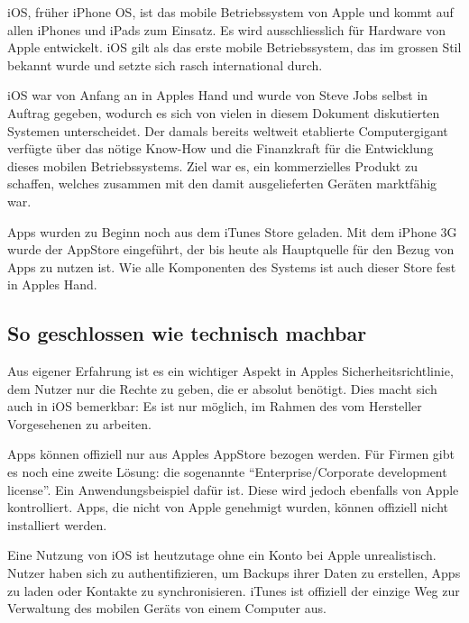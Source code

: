 iOS, früher iPhone OS, ist das mobile Betriebssystem von Apple und kommt auf allen iPhones und iPads zum Einsatz. Es wird ausschliesslich für Hardware von Apple entwickelt\thinspace\cite{online:ios-wikipedia}. iOS gilt als das erste mobile Betriebssystem, das im grossen Stil bekannt wurde und setzte sich rasch international durch.

iOS war von Anfang an in Apples Hand und wurde von Steve Jobs selbst in Auftrag gegeben, wodurch es sich von vielen in diesem Dokument diskutierten Systemen unterscheidet\thinspace\cite{online:ios-wikipedia}. Der damals bereits weltweit etablierte Computergigant verfügte über das nötige \mbox{Know-How} und die Finanzkraft für die Entwicklung dieses mobilen Betriebssystems. Ziel war es, ein kommerzielles Produkt zu schaffen, welches zusammen mit den damit ausgelieferten Geräten marktfähig war.

Apps wurden zu Beginn noch aus dem iTunes Store geladen\thinspace\cite{online:ios-appstore}. Mit dem iPhone 3G wurde der AppStore eingeführt, der bis heute als Hauptquelle für den Bezug von Apps zu nutzen ist. Wie alle Komponenten des Systems ist auch dieser Store fest in Apples Hand.
\newline

\subsection{So geschlossen wie technisch machbar}
Aus eigener Erfahrung ist es ein wichtiger Aspekt in Apples Sicherheitsrichtlinie, dem Nutzer nur die Rechte zu geben, die er absolut benötigt. Dies macht sich auch in iOS bemerkbar: Es ist nur möglich, im Rahmen des vom Hersteller Vorgesehenen zu arbeiten.

Apps können offiziell nur aus Apples AppStore bezogen werden. Für Firmen gibt es noch eine zweite Lösung: die sogenannte ``Enterprise/Corporate development license''. Ein Anwendungsbeispiel dafür ist\thinspace\cite{online:ios-xamarin}. Diese wird jedoch ebenfalls von Apple kontrolliert\thinspace\cite{online:ios-appsfromoutside}. Apps, die nicht von Apple genehmigt wurden, können offiziell nicht installiert werden\thinspace\cite{online:ios-appstore}.

Eine Nutzung von iOS ist heutzutage ohne ein Konto bei Apple unrealistisch. Nutzer haben sich zu authentifizieren, um Backups ihrer Daten zu erstellen, Apps zu laden oder Kontakte zu synchronisieren. iTunes ist offiziell der einzige Weg zur Verwaltung des mobilen Geräts von einem Computer aus.

